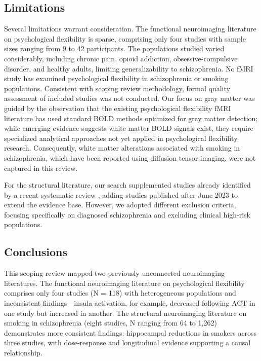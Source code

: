 \documentclass[12pt]{article}
\begin{document}
\subsection{Limitations}

Several limitations warrant consideration. The functional neuroimaging literature on psychological flexibility is sparse, comprising only four studies with sample sizes ranging from 9 to 42 participants. The populations studied varied considerably, including chronic pain, opioid addiction, obsessive-compulsive disorder, and healthy adults, limiting generalizability to schizophrenia. No fMRI study has examined psychological flexibility in schizophrenia or smoking populations. Consistent with scoping review methodology, formal quality assessment of included studies was not conducted. Our focus on gray matter was guided by the observation that the existing psychological flexibility fMRI literature has used standard BOLD methods optimized for gray matter detection; while emerging evidence suggests white matter BOLD signals exist, they require specialized analytical approaches not yet applied in psychological flexibility research. Consequently, white matter alterations associated with smoking in schizophrenia, which have been reported using diffusion tensor imaging, were not captured in this review.

For the structural literature, our search supplemented studies already identified by a recent systematic review \citep{koster2025}, adding studies published after June 2023 to extend the evidence base. However, we adopted different exclusion criteria, focusing specifically on diagnosed schizophrenia and excluding clinical high-risk populations.

\subsection{Conclusions}

This scoping review mapped two previously unconnected neuroimaging literatures. The functional neuroimaging literature on psychological flexibility comprises only four studies (N = 118) with heterogeneous populations and inconsistent findings---insula activation, for example, decreased following ACT in one study but increased in another. The structural neuroimaging literature on smoking in schizophrenia (eight studies, N ranging from 64 to 1,262) demonstrates more consistent findings: hippocampal reductions in smokers across three studies, with dose-response and longitudinal evidence supporting a causal relationship.
\end{document}
